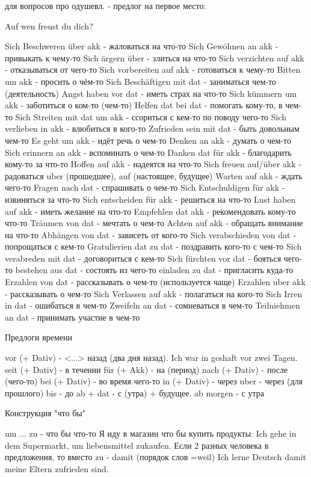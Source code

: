 \documentclass[12pt]{report}
\begin{document}
для вопросов про одушевл. - предлог на первое место:

Auf wen freust du dich?

Sich Beschweren über akk - жаловаться на что-то
Sich Gewöhnen an akk - привыкать к чему-то
Sich ärgern über - злиться на что-то
Sich verzichten auf akk - отказываться от чего-то
Sich vorbereiten auf akk - готовиться к чему-то
Bitten um akk - просить о чём-то
Sich Beschäftigen mit dat - заниматься чем-то (деятельность)
Angst haben vor dat - иметь страх на что-то
Sich kümmern um akk - заботиться о ком-то (чем-то)
Helfen dat bei dat - помогать кому-то, в чем-то
Sich Streiten mit dat um akk - ссориться с кем-то по поводу чего-то
Sich verlieben in akk - влюбиться в кого-то
Zufrieden sein mit dat - быть довольным чем-то
Es geht um akk - идёт речь о чем-то
Denken an akk - думать о чем-то
Sich erinnern an akk - вспоминать о чем-то
Danken dat für akk - благодарить кому-то за что-то
Hoffen auf akk - надеятся на что-то
Sich freuen auf/über akk - радоваться uber (прошедшее), auf (настоящее, будущее)
Warten auf akk - ждать чего-то
Fragen nach dat - спрашивать о чем-то
Sich Entschuldigen für akk - извиняться за что-то
Sich entscheiden für akk - решиться на что-то
Lust haben auf akk - иметь желание на что-то
Empfehlen dat akk - рекомендовать кому-то что-то
Träumen von dat - мечтать о чем-то
Achten auf akk - обращать внимание на что-то
Abhängen von dat - зависеть от кого-то
Sich verabschieden von dat - попрощаться с кем-то
Gratulierien dat zu dat - поздравить кого-то с чем-то
Sich verabreden mit dat - договориться с кем-то
Sich fürchten vor dat - бояться чего-то
bestehen aus dat - состоять из чего-то
einladen zu dat - пригласить куда-то
Erzahlen von dat - рассказывать о чем-то (используется чаще)
Erzahlen uber akk - рассказывать о чем-то 
Sich Verlassen auf akk - полагаться на кого-то
Sich Irren in dat - ошибаться в чем-то
Zweifeln an dat - сомневаться в чем-то
Teilniehmen an dat - принимать участие в чем-то

Предлоги времени

vor (+ Dativ) - <...> назад (два дня назад). Ich war in geshaft vor zwei Tagen.
seit (+ Dativ) - в течении 
für (+ Akk) - на (период)
nach (+ Dativ) - после (чего-то)
bei (+ Dativ) - во время чего-то
in (+ Dativ) - через
uber - через (для прошлого)
bis - до 
ab + dat - с (утра) + будущее. ab morgen - с утра

Конструкция "что бы"

um ... zu - что бы что-то
Я иду в магазин что бы купить продукты: Ich gehe in dem Supermarkt, um liebensmittel zukaufen.
Если 2 разных человека в предложения, то вместо zu - damit (порядок слов =weil)
Ich lerne Deutsch damit meine Eltern zufrieden sind.
\end{document}
